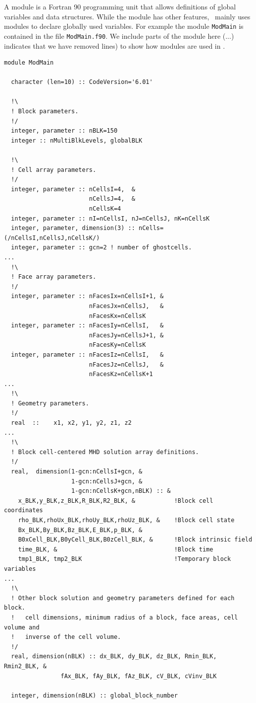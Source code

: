 A module is a Fortran 90 programming unit that allows
definitions of global variables and data structures.  
While the module has other features, \BATSRUS\ mainly uses
modules to declare globally used variables.  For example the module 
{\tt ModMain} is contained in
the file {\tt ModMain.f90}.  We include parts of the module here
(...) indicates that we have removed lines) to show how modules are
used in \BATSRUS.
\begin{verbatim}
module ModMain

  character (len=10) :: CodeVersion='6.01'

  !\
  ! Block parameters.
  !/
  integer, parameter :: nBLK=150
  integer :: nMultiBlkLevels, globalBLK

  !\
  ! Cell array parameters.
  !/
  integer, parameter :: nCellsI=4,  &
                        nCellsJ=4,  &
                        nCellsK=4
  integer, parameter :: nI=nCellsI, nJ=nCellsJ, nK=nCellsK
  integer, parameter, dimension(3) :: nCells=(/nCellsI,nCellsJ,nCellsK/)
  integer, parameter :: gcn=2 ! number of ghostcells.
...
  !\
  ! Face array parameters.
  !/
  integer, parameter :: nFacesIx=nCellsI+1, &
                        nFacesJx=nCellsJ,   &
                        nFacesKx=nCellsK
  integer, parameter :: nFacesIy=nCellsI,   &
                        nFacesJy=nCellsJ+1, &
                        nFacesKy=nCellsK
  integer, parameter :: nFacesIz=nCellsI,   &
                        nFacesJz=nCellsJ,   &
                        nFacesKz=nCellsK+1
...
  !\
  ! Geometry parameters.
  !/
  real  ::    x1, x2, y1, y2, z1, z2
...
  !\
  ! Block cell-centered MHD solution array definitions.
  !/
  real,  dimension(1-gcn:nCellsI+gcn, &
                   1-gcn:nCellsJ+gcn, &
                   1-gcn:nCellsK+gcn,nBLK) :: &
    x_BLK,y_BLK,z_BLK,R_BLK,R2_BLK, &           !Block cell coordinates
    rho_BLK,rhoUx_BLK,rhoUy_BLK,rhoUz_BLK, &    !Block cell state
    Bx_BLK,By_BLK,Bz_BLK,E_BLK,p_BLK, &         
    B0xCell_BLK,B0yCell_BLK,B0zCell_BLK, &      !Block intrinsic field
    time_BLK, &                                 !Block time 
    tmp1_BLK, tmp2_BLK                          !Temporary block variables
...
  !\
  ! Other block solution and geometry parameters defined for each block.
  !   cell dimensions, minimum radius of a block, face areas, cell volume and 
  !   inverse of the cell volume.  
  !/
  real, dimension(nBLK) :: dx_BLK, dy_BLK, dz_BLK, Rmin_BLK, Rmin2_BLK, &
			    fAx_BLK, fAy_BLK, fAz_BLK, cV_BLK, cVinv_BLK

  integer, dimension(nBLK) :: global_block_number


\end{verbatim}
